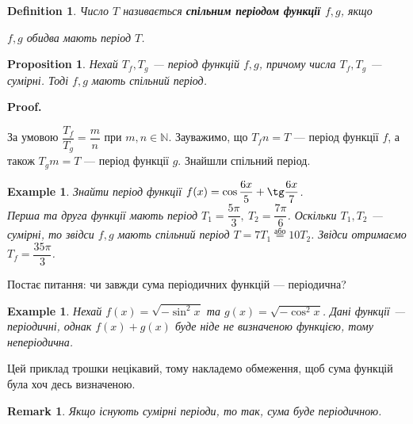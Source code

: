 \documentclass[a4paper, 10pt]{article}
\makeatletter
\def\qed{$\blacksquare$}
\theoremstyle{theoremdd}
\theoremstyle{theoremdd}
\newtheorem{definition}[theorem]{Definition}
\theoremstyle{theoremdd}
\theoremstyle{theoremdd}
\newtheorem{example}[theorem]{Example}
\theoremstyle{theoremdd}
\newtheorem{proposition}[theorem]{Proposition}
\theoremstyle{theoremdd}
\newtheorem{remark}[theorem]{Remark}
\theoremstyle{theoremdd}
\theoremstyle{theoremdd}
\renewenvironment{proof}[1][Proof.\\]{\par
\pushQED{\hfill \qed}%
\normalfont \topsep6\p@\@plus6\p@\relax
\trivlist
\item\relax
{\bfseries
#1\@addpunct{.}}\hspace\labelsep\ignorespaces
}{%
\popQED\endtrivlist\@endpefalse
}
\makeatother
\begin{document}
\begin{definition}
Число $T$ називається \textbf{спільним періодом функції $f,g$}, якщо
\begin{center}
$f,g$ обидва мають період $T$.
\end{center}
\end{definition}

\begin{proposition}
Нехай $T_f,T_g$ --- період функцій $f,g$, причому числа $T_f,T_g$ --- сумірні. Тоді $f,g$ мають спільний період.
\end{proposition}

\begin{proof}
За умовою $\dfrac{T_f}{T_g} = \dfrac{m}{n}$ при $m,n \in \mathbb{N}$. Зауважимо, що $T_f n = T$ --- період функції $f$, а також $T_g m = T$ --- період функції $g$. Знайшли спільний період.
\end{proof}

\begin{example}
Знайти період функції $f(x) = \cos \dfrac{6x}{5} + \tg \dfrac{6x}{7}$.\\
Перша та друга функції мають період $T_1 = \dfrac{5\pi}{3},\ T_2 = \dfrac{7\pi}{6}$. Оскільки $T_1,T_2$ --- сумірні, то звідси $f,g$ мають спільний період $T = 7T_1 \overset{\text{або}}{=} 10T_2$. Звідси отримаємо $T_f = \dfrac{35\pi}{3}$. 
\end{example}

Постає питання: чи завжди сума періодичних функцій --- періодична?

\begin{example}
Нехай $f(x) = \sqrt{-\sin^2 x}$ та $g(x) = \sqrt{-\cos^2 x}$. Дані функції --- періодичні, однак $f(x)+g(x)$ буде ніде не визначеною функцією, тому неперіодична.
\end{example}

Цей приклад трошки нецікавий, тому накладемо обмеження, щоб сума функцій була хоч десь визначеною.

\begin{remark}
Якщо існують сумірні періоди, то так, сума буде періодичною.
\end{remark}
\end{document}
